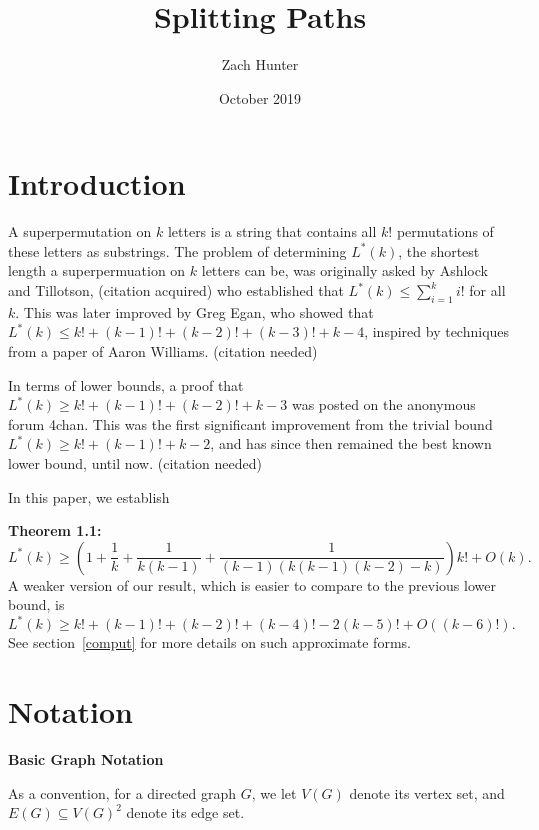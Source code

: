 \documentclass{article}
\title{Splitting Paths}
\author{Zach Hunter}
\date{October 2019}
\newcommand{\hide}[1]{}
\newcommand{\dc}[1]{}%
\begin{document}
\maketitle

\section{Introduction}

A superpermutation on $k$ letters is a string that contains all $k!$ permutations of these letters as substrings. The problem of determining $L^*(k)$, the shortest length a superpermuation on $k$ letters can be, was originally asked by  Ashlock and Tillotson, (citation acquired)\hide{(Daniel A. Ashlock and Jenett Tillotson. Construction of small superpermutations
and minimal injective superstrings. Congressus Numerantium,
93:91–98, 1993.)\dc{ use a ref command and bibliography package (see AMT papers, I don't remember all the syntax)}} who established that $L^*(k) \leq \sum_{i=1}^k i!$ for all $k$. This was later improved by Greg Egan, who showed that $L^*(k) \leq k!+(k-1)!+(k-2)!+(k-3)!+k-4$, inspired by techniques from a paper of Aaron Williams. (citation needed)

In terms of lower bounds, a proof that $L^*(k) \geq k! + (k-1)!+(k-2)! +k-3$ was posted on the anonymous forum 4chan. This was the first significant improvement from the trivial bound $L^*(k) \geq k! +(k-1)!+k-2$, and has since then remained the best known lower bound, until now. (citation needed)

In this paper, we establish 

\textbf{Theorem 1.1:}
\[L^*(k) \ge \left(1+ \frac{1}{k} + \frac{1}{k(k-1)} + \frac{1}{(k-1)(k(k-1)(k-2)-k)}\right)k! +O(k).\]A weaker version of our result, which is easier to compare to the previous lower bound, is
\[L^*(k) \geq k!+(k-1)!+(k-2)!+(k-4)!-2(k-5)! +O((k-6)!).\]
See section~\ref{comput} for more details on such approximate forms.


\section{Notation}

\textbf{Basic Graph Notation}

As a convention, for a directed graph $G$, we let $V(G)$ denote its vertex set, and $E(G) \subseteq V(G)^2$ denote its edge set.

\vspace{1.75em}
\end{document}
